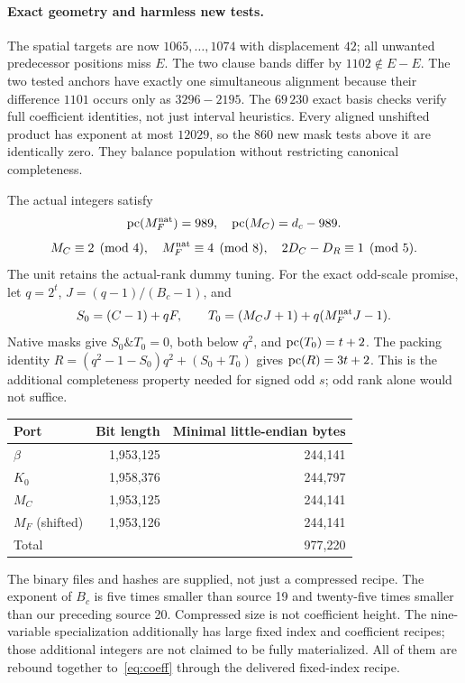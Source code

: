 \documentclass[11pt]{article}
\begin{document}
\paragraph{Exact geometry and harmless new tests.}
The spatial targets are now $1065,\ldots,1074$ with displacement $42$;
all unwanted predecessor positions miss $E$. The two clause bands differ
by $1102\notin E-E$. The two tested anchors have exactly one simultaneous
alignment because their difference $1101$ occurs only as $3296-2195$.
The $69\,230$ exact basis checks verify full coefficient identities, not
just interval heuristics. Every aligned unshifted product has exponent at
most $12029$, so the $860$ new mask tests above it are identically zero.
They balance population without restricting canonical completeness.

The actual integers satisfy
\[
 \operatorname{pc}(M_F^{\rm nat})=989,\quad \operatorname{pc}(M_C)=d_c-989.
\]
\[
 M_C\equiv2\pmod4,\quad M_F^{\rm nat}\equiv4\pmod8,
 \quad2D_C-D_R\equiv1\pmod5.
\]
The unit retains the actual-rank dummy tuning. For the exact odd-scale
promise, let $q=2^t$, $J=(q-1)/(B_c-1)$, and
\[
 S_0=(C-1)+qF,\qquad
 T_0=(M_CJ+1)+q(M_F^{\rm nat}J-1).
\]
Native masks give $S_0\mathbin{\&}T_0=0$, both below $q^2$, and
$\operatorname{pc}(T_0)=t+2$. The packing identity
$R=(q^2-1-S_0)q^2+(S_0+T_0)$ gives $\operatorname{pc}(R)=3t+2$.
This is the additional completeness property needed for signed odd $s$;
odd rank alone would not suffice.

\begin{center}\small
\begin{tabular}{@{}lrr@{}}\toprule
Port & Bit length & Minimal little-endian bytes\\\midrule
$\beta$ &1,953,125&244,141\\
$K_0$ &1,958,376&244,797\\
$M_C$ &1,953,125&244,141\\
$M_F$ (shifted)&1,953,126&244,141\\\midrule
Total&&977,220\\\bottomrule
\end{tabular}
\end{center}
The binary files and hashes are supplied, not just a compressed recipe.
The exponent of $B_c$ is five times smaller than source 19 and twenty-five
times smaller than our preceding source 20. Compressed size is not coefficient
height. The nine-variable specialization additionally has large fixed index
and coefficient recipes; those additional integers are not claimed to be
fully materialized. All of them are rebound together to~\eqref{eq:coeff}
through the delivered fixed-index recipe.
\end{document}
